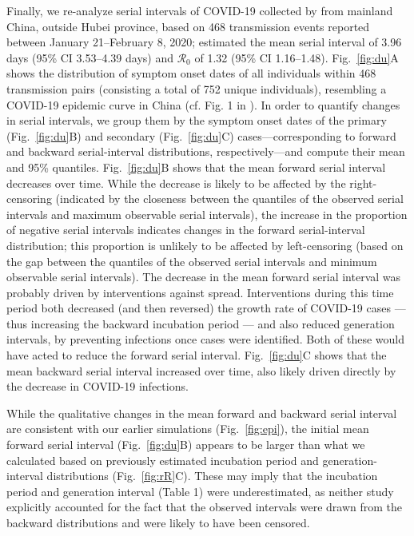 \documentclass[12pt]{article}
\newcommand{\fref}[1]{Fig.~\ref{fig:#1}}
\newcommand{\Rx}[1]{\ensuremath{{\mathcal R}_{#1}}\xspace}
\newcommand{\Ro}{\Rx{0}}
\begin{document}
Finally, we re-analyze serial intervals of COVID-19 collected by \cite{du2020serial} from mainland China, outside Hubei province, based on 468 transmission events reported between January 21--February 8, 2020;
\cite{du2020serial} estimated the mean serial interval of 3.96 days (95\% CI 3.53–4.39 days) and \Ro of 1.32 (95\% CI 1.16–1.48).
\fref{du}A shows the distribution of symptom onset dates of all individuals within 468 transmission pairs (consisting a total of 752 unique individuals), resembling a COVID-19 epidemic curve in China (cf. Fig. 1 in \cite{pan2020jama}).
In order to quantify changes in serial intervals, we group them by the symptom onset dates of the primary (\fref{du}B) and secondary (\fref{du}C) cases---corresponding to forward and backward serial-interval distributions, respectively---and compute their mean and 95\% quantiles.
\fref{du}B shows that the mean forward serial interval decreases over time.
While the decrease is likely to be affected by the right-censoring (indicated by the closeness between the quantiles of the observed serial intervals and maximum observable serial intervals), the increase in the proportion of negative serial intervals indicates changes in the forward serial-interval distribution;
this proportion is unlikely to be affected by left-censoring (based on the gap between the quantiles of the observed serial intervals and minimum observable serial intervals).
The decrease in the mean forward serial interval was probably driven by interventions against spread.
Interventions during this time period both decreased (and then reversed) the growth rate of COVID-19 cases --- thus increasing the backward incubation period --- and also reduced generation intervals, by preventing infections once cases were identified.
Both of these would have acted to reduce the forward serial interval.
\fref{du}C shows that the mean backward serial interval increased over time, also likely driven directly by the decrease in COVID-19 infections.

While the qualitative changes in the mean forward and backward serial interval are consistent with our earlier simulations (\fref{epi}), the initial mean forward serial interval (\fref{du}B) appears to be larger than what we calculated based on previously estimated incubation period and generation-interval distributions (\fref{rR}C).
These may imply that the incubation period and generation interval (Table 1) were underestimated, as neither study explicitly accounted for the fact that the observed intervals were drawn from the backward distributions and were likely to have been censored.
\end{document}
